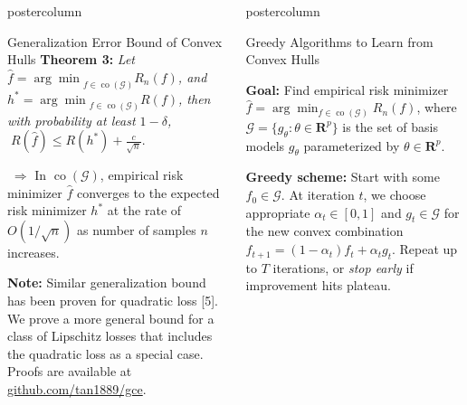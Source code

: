 \documentclass{beamer}
\newcommand{\setG}{{\mathcal G}}
\newcommand{\realnum}{{\mathbf R}}
\newcommand{\argmin}{{\arg\min}}
\DeclareMathOperator{\conv}{co}
\newlength{\columnheight}
\begin{document}
\begin{frame}
\begin{columns}
\begin{column}{.37\textwidth}
\begin{beamercolorbox}[center]{postercolumn}
\begin{minipage}{.98\textwidth}
{\begin{myblock}{Generalization Error Bound of Convex Hulls}
\vspace{0.3em}
{\color{blue}\textbf{Theorem 3:}} 
\emph{Let $\hat{f} = \argmin_{f \in \conv(\setG)} R_{n}(f)$, and 
	$h^{*} = \argmin_{f \in \conv(\setG)} R(f)$, then with probability at
	least $1 - \delta$,} 
	{\color{blue}$\; R(\hat{f}) \le R(h^{*}) + \frac{c}{\sqrt{n}}$.}
	
$\;\Longrightarrow$ In $\conv(\setG)$, empirical risk minimizer $\hat f$ converges to the expected risk minimizer $h^*$ at the rate of $O(1/\sqrt n)$ as number of samples $n$ increases.

\vspace{0.3em}
{\color{blue}\textbf{Note:}} Similar generalization bound has been proven for quadratic loss [5]. 
We prove a more general bound for a class of Lipschitz losses that includes the quadratic loss as a special case. Proofs are available at \url{github.com/tan1889/gce}.
\end{myblock}\vfill

}\end{minipage}\end{beamercolorbox}
\end{column}

\begin{column}{.37\textwidth}
\begin{beamercolorbox}[center]{postercolumn}
\begin{minipage}{.98\textwidth} %
\parbox[t][\columnheight]{\textwidth}{ 

\begin{myblock}{Greedy Algorithms to Learn from Convex Hulls}

\RaggedRight
{\color{blue}\textbf{Goal:}} Find empirical risk minimizer $\hat{f} = \arg\min_{f \in \conv(\setG)} R_n(f)$, where
$\setG = \{g_{\theta}: \theta \in \realnum^{p}\}$ is the set of basis models $g_{\theta}$
parameterized by $\theta \in \realnum^{p}$. 

\vspace{0.3em}
{\color{blue}\textbf{Greedy scheme:}} Start with some $f_{0} \in \setG$.
At iteration $t$, we choose appropriate $\alpha_{t} \in [0,1]$ and 
$g_{t} \in \setG$ for the new convex combination $f_{t+1} = (1- \alpha_{t}) f_{t} + \alpha_{t} g_{t}.$
Repeat up to $T$ iterations, or \emph{stop early} if improvement hits plateau. 


\end{myblock}}
\end{minipage}
\end{beamercolorbox}
\end{column}
\end{columns}
\end{frame}
\end{document}
